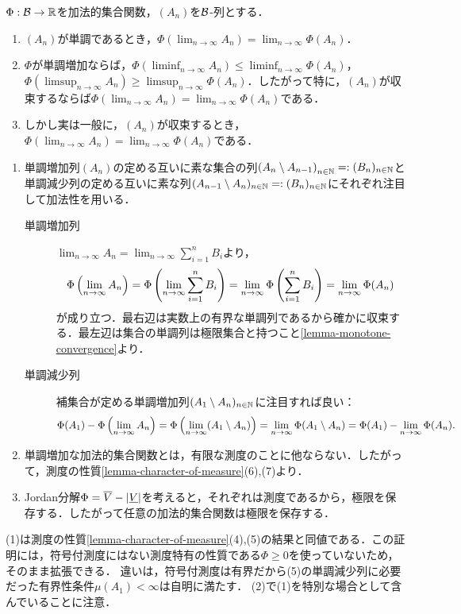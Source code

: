 \documentclass[uplatex, dvipdfmx]{jsreport}
\begin{document}
\begin{proposition}[極限の保存]\label{prop-limits-of-additive-set-function}
    $\Phi:\mathcal{B}\to\mathbb{R}$を加法的集合関数，$(A_n)$を$\mathcal{B}$-列とする．
    \begin{enumerate}
        \item $(A_n)$が単調であるとき，$\Phi(\lim_{n\to\infty}A_n)=\lim_{n\to\infty}\Phi(A_n)$．
        \item $\Phi$が単調増加ならば，$\Phi(\liminf_{n\to\infty}A_n)\le\liminf_{n\to\infty}\Phi(A_n)$，$\Phi(\limsup_{n\to\infty}A_n)\ge\limsup_{n\to\infty}\Phi(A_n)$．したがって特に，$(A_n)$が収束するならば$\Phi(\lim_{n\to\infty}A_n)=\lim_{n\to\infty}\Phi(A_n)$である．
        \item しかし実は一般に，$(A_n)$が収束するとき，$\Phi(\lim_{n\to\infty}A_n)=\lim_{n\to\infty}\Phi(A_n)$である．
    \end{enumerate}
\end{proposition}
\begin{Proof}\mbox{}
    \begin{enumerate}
        \item 単調増加列$(A_n)$の定める互いに素な集合の列$\left(A_n\setminus A_{n-1}\right)_{n\in\mathbb{N}}=:(B_n)_{n\in\mathbb{N}}$と単調減少列の定める互いに素な列$(A_{n-1}\setminus A_{n})_{n\in\mathbb{N}}=:(B_n)_{n\in\mathbb{N}}$にそれぞれ注目して加法性を用いる．
        \begin{description}
            \item[単調増加列] $\lim_{n\to\infty}A_n=\lim_{n\to\infty}\sum^n_{i=1}B_i$より，
            \[\Phi\left(\lim_{n\to\infty}A_n\right)=\Phi\left(\lim_{n\to\infty}\sum^n_{i=1}B_i\right)=\lim_{n\to\infty}\Phi\left(\sum^n_{i=1}B_i\right)=\lim_{n\to\infty}\Phi(A_n)\]
            が成り立つ．最右辺は実数上の有界な単調列であるから確かに収束する．最左辺は集合の単調列は極限集合と持つこと\ref{lemma-monotone-convergence}より．
            \item[単調減少列] 
            補集合が定める単調増加列$(A_1\setminus A_n)_{n\in\mathbb{N}}$に注目すれば良い：
            \[\Phi(A_1)-\Phi\left(\lim_{n\to\infty}A_n\right)=\Phi\left(\lim_{n\to\infty}(A_1\setminus A_n)\right)=\lim_{n\to\infty}\Phi(A_1\setminus A_n)=\Phi(A_1)-\lim_{n\to\infty}\Phi(A_n).\]
        \end{description}
        \item 単調増加な加法的集合関数とは，有限な測度のことに他ならない．したがって，測度の性質\ref{lemma-character-of-measure}(6),(7)より．
        \item Jordan分解$\Phi=\overline{V}-\lvert\underline{V}\rvert$を考えると，それぞれは測度であるから，極限を保存する．したがって任意の加法的集合関数は極限を保存する．
    \end{enumerate}
\end{Proof}
\begin{remarks}
    (1)は測度の性質\ref{lemma-character-of-measure}(4),(5)の結果と同値である．この証明には，符号付測度にはない測度特有の性質である$\Phi\ge 0$を使っていないため，そのまま拡張できる．
    違いは，符号付測度は有界だから(5)の単調減少列に必要だった有界性条件$\mu(A_1)<\infty$は自明に満たす．
    (2)で(1)を特別な場合として含んでいることに注意．
\end{remarks}
\end{document}
